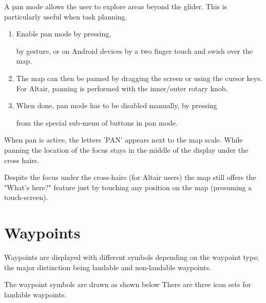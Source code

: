 A pan mode allows the user to explore areas beyond the glider.  This
is particularly useful when task planning.
\begin{enumerate}
\item Enable pan mode by pressing,  
\begin{quote}
\blink{}
\end{quote}
by gesture, or on Android devices by a two finger touch and swish over the map.

\item The map can then be panned by dragging the screen or using the cursor
  keys.  For Altair, panning is performed with the inner/outer rotary knob.
\item When done, pan mode has to be disabled manually, by pressing
\begin{quote}
\end{quote}
from the special sub-menu of buttons in pan mode.
\end{enumerate} 

When pan is active, the letters 'PAN' appears next to the map scale.  While
panning the location of the focus stays in the middle of the display under the
cross hairs. 

Despite the focus under the cross-hairs (for Altair users) the map 
still offers the "What's here?" feature just by touching any 
position on the map (presuming a touch-screen).


\section{Waypoints} \label{sec:waypoint-schemes}
Waypoints are displayed with different symbols depending on the
waypoint type; the major distinction being landable and non-landable
waypoints.

The waypoint symbols are drawn as shown below There are three icon sets for
landable waypoints. 

